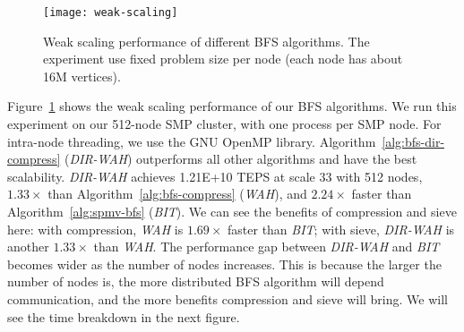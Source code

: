 \documentclass[conference]{IEEEtran}
\begin{document}
\begin{figure}[t]
  \centering
  \texttt{[image: weak-scaling]}
  \caption{Weak scaling performance of different BFS algorithms. The
    experiment use fixed problem size per node (each node has about 16M
    vertices).}
  \label{fig:weak-scaling}
\end{figure}
Figure~\ref{fig:weak-scaling} shows the weak scaling performance of our BFS
algorithms. We run this experiment on our 512-node SMP cluster, with one
process per SMP node. For intra-node threading, we use the GNU OpenMP library.
Algorithm~\ref{alg:bfs-dir-compress} (\textit{DIR-WAH}) outperforms all other
algorithms and have the best scalability.  \textit{DIR-WAH} achieves 1.21E+10
TEPS at scale 33 with 512 nodes, $1.33\times$ than
Algorithm~\ref{alg:bfs-compress} (\textit{WAH}), and $2.24\times$ faster than
Algorithm~\ref{alg:spmv-bfs} (\textit{BIT}). We can see the benefits of
compression and sieve here: with compression, \textit{WAH} is $1.69\times$
faster than \textit{BIT}; with sieve, \textit{DIR-WAH} is another $1.33\times$
than \textit{WAH}. The performance gap between \textit{DIR-WAH} and
\textit{BIT} becomes wider as the number of nodes increases. This is because
the larger the number of nodes is, the more distributed BFS algorithm will
depend communication, and the more benefits compression and sieve will
bring. We will see the time breakdown in the next figure.
\end{document}
